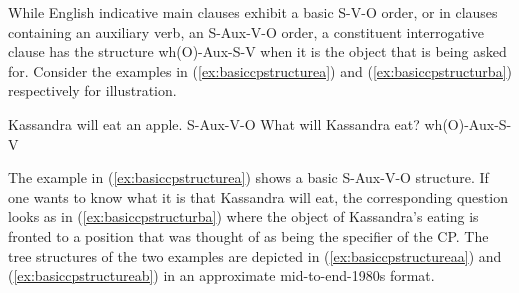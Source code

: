 While English indicative main clauses exhibit a basic S-V-O order, or in clauses containing an auxiliary verb, an S-Aux-V-O order, a constituent interrogative clause has the structure wh(O)-Aux-S-V when it is the object that is being asked for. Consider the examples in (\ref{ex:basiccpstructurea}) and (\ref{ex:basiccpstructurba}) respectively for illustration.


\begin{exe}
\ex\begin{xlist}
\ex Kassandra will eat an apple. \hfill S-Aux-V-O\label{ex:basiccpstructurea}
\ex What will Kassandra eat? \hfill wh(O)-Aux-S-V \label{ex:basiccpstructurba}
\end{xlist}
\end{exe}

\noindent The example in (\ref{ex:basiccpstructurea}) shows a basic S-Aux-V-O structure. If one wants to know what it is that Kassandra will eat, the corresponding question looks as in (\ref{ex:basiccpstructurba}) where the object of Kassandra's eating is fronted to a position that was thought of as being the specifier of the CP. The tree structures of the two examples are depicted in (\ref{ex:basiccpstructureaa}) and (\ref{ex:basiccpstructureab}) in an approximate mid-to-end-1980s format.

\begin{exe}
\ex
\setlength{\columnsep}{-80pt}
\begin{multicols}{2}
\begin{xlist}
\ex \label{ex:basiccpstructureaa}

\ex \label{ex:basiccpstructureab}


\end{xlist}
\end{multicols}
\end{exe}





